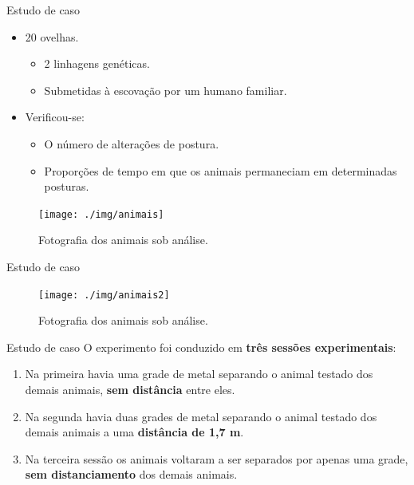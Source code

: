 \documentclass[
  ignorenonframetext,
  serif,
  professionalfont,
  usenames,
  dvipsnames,
  aspectratio = 169]{beamer}
\providecommand{\tightlist}{%
  \setlength{\itemsep}{0pt}\setlength{\parskip}{0pt}}
\renewcommand{\tightlist}{%
  \setlength{\itemsep}{0\baselineskip}
  \setlength{\parskip}{0.25\baselineskip}
}
\def\beginAThirdColumn{\begin{minipage}{0.31\textwidth}}%
\def\beginTwoThirdsColumn{\begin{minipage}{0.64\textwidth}}%
\def\endColumns{\end{minipage}}%
\begin{document}
\begin{frame}{Estudo de caso}
\protect\hypertarget{estudo-de-caso-1}{}
\beginAThirdColumn

\begin{itemize}
\item
  20 ovelhas.

  \begin{itemize}
  \item
    2 linhagens genéticas.
  \item
    Submetidas à escovação por um humano familiar.
  \end{itemize}
\item
  Verificou-se:

  \begin{itemize}
  \tightlist
  \item
    O número de alterações de postura.
  \item
    Proporções de tempo em que os animais permaneciam em determinadas
    posturas.
  \end{itemize}
\end{itemize}

\endColumns
\beginTwoThirdsColumn

\begin{figure}

{\centering \texttt{[image: ./img/animais]} 

}

\caption{Fotografia dos animais sob análise.}\label{fig:unnamed-chunk-3}
\end{figure}

\endColumns
\end{frame}

\begin{frame}{Estudo de caso}
\protect\hypertarget{estudo-de-caso-2}{}
\begin{figure}

{\centering \texttt{[image: ./img/animais2]} 

}

\caption{Fotografia dos animais sob análise.}\label{fig:unnamed-chunk-4}
\end{figure}
\end{frame}

\begin{frame}{Estudo de caso}
\protect\hypertarget{estudo-de-caso-3}{}
O experimento foi conduzido em \textbf{três sessões experimentais}:

\begin{enumerate}
\item
  Na primeira havia uma grade de metal separando o animal testado dos
  demais animais, \textbf{sem distância} entre eles.
\item
  Na segunda havia duas grades de metal separando o animal testado dos
  demais animais a uma \textbf{distância de 1,7 m}.
\item
  Na terceira sessão os animais voltaram a ser separados por apenas uma
  grade, \textbf{sem distanciamento} dos demais animais.
\end{enumerate}
\end{frame}
\end{document}

